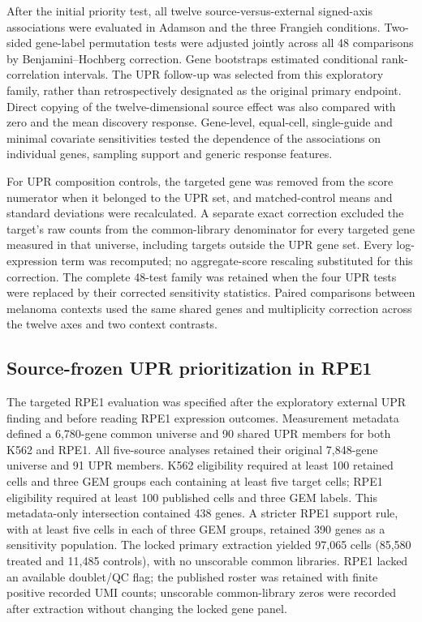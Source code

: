 \documentclass[a4paper,fleqn]{cas-sc}
\makeatletter
\DeclareRobustCommand{\rev}[1]{{\color{red}\def\@citecolor{black}\def\@linkcolor{red}\def\@urlcolor{red}#1}}
\makeatother
\begin{document}
\rev{After the initial priority test, all twelve source-versus-external signed-axis associations were evaluated in Adamson and the three Frangieh conditions.} \rev{Two-sided gene-label permutation tests were adjusted jointly across all 48 comparisons by Benjamini--Hochberg correction.} \rev{Gene bootstraps estimated conditional rank-correlation intervals.} \rev{The UPR follow-up was selected from this exploratory family, rather than retrospectively designated as the original primary endpoint.} \rev{Direct copying of the twelve-dimensional source effect was also compared with zero and the mean discovery response.} \rev{Gene-level, equal-cell, single-guide and minimal covariate sensitivities tested the dependence of the associations on individual genes, sampling support and generic response features.}

\rev{For UPR composition controls, the targeted gene was removed from the score numerator when it belonged to the UPR set, and matched-control means and standard deviations were recalculated.} \rev{A separate exact correction excluded the target's raw counts from the common-library denominator for every targeted gene measured in that universe, including targets outside the UPR gene set.} \rev{Every log-expression term was recomputed; no aggregate-score rescaling substituted for this correction.} \rev{The complete 48-test family was retained when the four UPR tests were replaced by their corrected sensitivity statistics.} \rev{Paired comparisons between melanoma contexts used the same shared genes and multiplicity correction across the twelve axes and two context contrasts.}

\subsection{\rev{Source-frozen UPR prioritization in RPE1}}

\rev{The targeted RPE1 evaluation was specified after the exploratory external UPR finding and before reading RPE1 expression outcomes.} \rev{Measurement metadata defined a 6,780-gene common universe and 90 shared UPR members for both K562 and RPE1.} \rev{All five-source analyses retained their original 7,848-gene universe and 91 UPR members.} \rev{K562 eligibility required at least 100 retained cells and three GEM groups each containing at least five target cells; RPE1 eligibility required at least 100 published cells and three GEM labels.} \rev{This metadata-only intersection contained 438 genes.} \rev{A stricter RPE1 support rule, with at least five cells in each of three GEM groups, retained 390 genes as a sensitivity population.} \rev{The locked primary extraction yielded 97,065 cells (85,580 treated and 11,485 controls), with no unscorable common libraries.} \rev{RPE1 lacked an available doublet/QC flag; the published roster was retained with finite positive recorded UMI counts; unscorable common-library zeros were recorded after extraction without changing the locked gene panel.}
\end{document}
